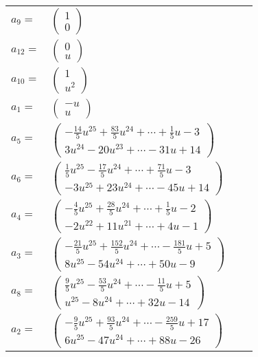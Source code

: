 \documentclass[1p]{elsarticle_modified}
\theoremstyle{definition}
\begin{document}
\begin{tabular}{m{7pt} m{180pt} m{7pt} m{180pt} }
\flushright $a_{9}=$&$\begin{pmatrix}1\\0\end{pmatrix}$ \\
\flushright $a_{12}=$&$\begin{pmatrix}0\\u\end{pmatrix}$ \\
\flushright $a_{10}=$&$\begin{pmatrix}1\\u^2\end{pmatrix}$ \\
\flushright $a_{1}=$&$\begin{pmatrix}- u\\u\end{pmatrix}$ \\
\flushright $a_{5}=$&$\begin{pmatrix}-\frac{14}{5} u^{25}+\frac{83}{5} u^{24}+\cdots+\frac{1}{5} u-3\\3 u^{24}-20 u^{23}+\cdots-31 u+14\end{pmatrix}$ \\
\flushright $a_{6}=$&$\begin{pmatrix}\frac{1}{5} u^{25}-\frac{17}{5} u^{24}+\cdots+\frac{71}{5} u-3\\-3 u^{25}+23 u^{24}+\cdots-45 u+14\end{pmatrix}$ \\
\flushright $a_{4}=$&$\begin{pmatrix}-\frac{4}{5} u^{25}+\frac{28}{5} u^{24}+\cdots+\frac{1}{5} u-2\\-2 u^{22}+11 u^{21}+\cdots+4 u-1\end{pmatrix}$ \\
\flushright $a_{3}=$&$\begin{pmatrix}-\frac{21}{5} u^{25}+\frac{152}{5} u^{24}+\cdots-\frac{181}{5} u+5\\8 u^{25}-54 u^{24}+\cdots+50 u-9\end{pmatrix}$ \\
\flushright $a_{8}=$&$\begin{pmatrix}\frac{9}{5} u^{25}-\frac{53}{5} u^{24}+\cdots-\frac{11}{5} u+5\\u^{25}-8 u^{24}+\cdots+32 u-14\end{pmatrix}$ \\
\flushright $a_{2}=$&$\begin{pmatrix}-\frac{9}{5} u^{25}+\frac{93}{5} u^{24}+\cdots-\frac{259}{5} u+17\\6 u^{25}-47 u^{24}+\cdots+88 u-26\end{pmatrix}$ \\

\end{tabular}
\end{document}
